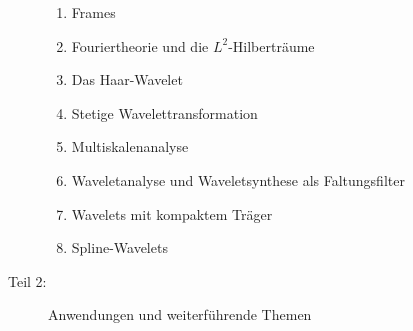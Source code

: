 \documentclass[handout]{beamer}
\begin{document}
\begin{frame}
\begin{columns}[onlytextwidth]
\begin{column}{0.67\textwidth}
\begin{description}
\begin{enumerate}
\item Frames
\item Fouriertheorie und die $L^2$-Hilberträume
\item Das Haar-Wavelet
\item Stetige Wavelettransformation
\item Multiskalenanalyse
\item Waveletanalyse und Waveletsynthese als Faltungsfilter
\item Wavelets mit kompaktem Träger
\item Spline-Wavelets
\end{enumerate}
\item[Teil 2:] Anwendungen und weiterführende Themen
\begin{enumerate}
\setcounter{enumi}{9}
\end{enumerate}
\end{description}
\end{column}
\end{columns}
\end{frame}
\end{document}
